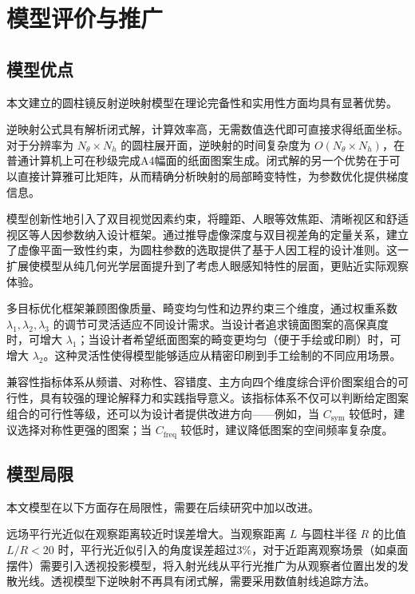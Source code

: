 \section{模型评价与推广}

\subsection{模型优点}

本文建立的圆柱镜反射逆映射模型在理论完备性和实用性方面均具有显著优势。

逆映射公式具有解析闭式解，计算效率高，无需数值迭代即可直接求得纸面坐标。对于分辨率为 $N_\theta \times N_h$ 的圆柱展开面，逆映射的时间复杂度为 $O(N_\theta \times N_h)$，在普通计算机上可在秒级完成A4幅面的纸面图案生成。闭式解的另一个优势在于可以直接计算雅可比矩阵，从而精确分析映射的局部畸变特性，为参数优化提供梯度信息。

模型创新性地引入了双目视觉因素约束，将瞳距、人眼等效焦距、清晰视区和舒适视区等人因参数纳入设计框架。通过推导虚像深度与双目视差角的定量关系，建立了虚像平面一致性约束，为圆柱参数的选取提供了基于人因工程的设计准则。这一扩展使模型从纯几何光学层面提升到了考虑人眼感知特性的层面，更贴近实际观察体验。

多目标优化框架兼顾图像质量、畸变均匀性和边界约束三个维度，通过权重系数 $\lambda_1, \lambda_2, \lambda_3$ 的调节可灵活适应不同设计需求。当设计者追求镜面图案的高保真度时，可增大 $\lambda_1$；当设计者希望纸面图案的畸变更均匀（便于手绘或印刷）时，可增大 $\lambda_2$。这种灵活性使得模型能够适应从精密印刷到手工绘制的不同应用场景。

兼容性指标体系从频谱、对称性、容错度、主方向四个维度综合评价图案组合的可行性，具有较强的理论解释力和实践指导意义。该指标体系不仅可以判断给定图案组合的可行性等级，还可以为设计者提供改进方向——例如，当 $C_{\text{sym}}$ 较低时，建议选择对称性更强的图案；当 $C_{\text{freq}}$ 较低时，建议降低图案的空间频率复杂度。

\subsection{模型局限}

本文模型在以下方面存在局限性，需要在后续研究中加以改进。

远场平行光近似在观察距离较近时误差增大。当观察距离 $L$ 与圆柱半径 $R$ 的比值 $L/R < 20$ 时，平行光近似引入的角度误差超过3\%，对于近距离观察场景（如桌面摆件）需要引入透视投影模型，将入射光线从平行光推广为从观察者位置出发的发散光线。透视模型下逆映射不再具有闭式解，需要采用数值射线追踪方法。

